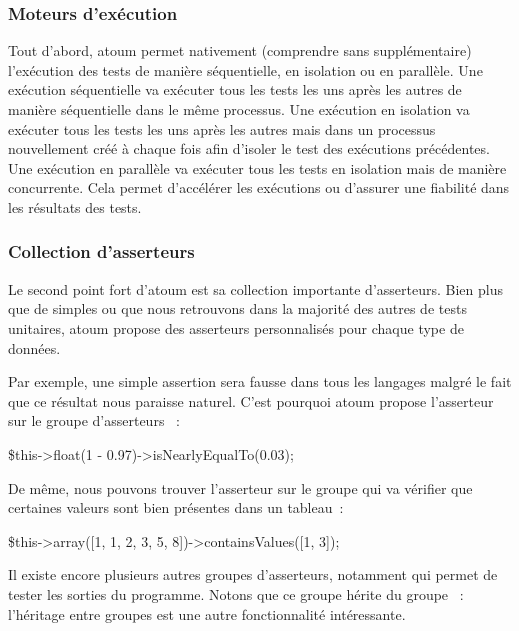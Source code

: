 \subsubsection{Moteurs d'exécution}

Tout d'abord, atoum permet nativement (comprendre sans 
supplémentaire) l'exécution des tests de manière séquentielle, en isolation ou
en parallèle. Une exécution séquentielle va exécuter tous les tests les uns
après les autres de manière séquentielle dans le même processus. Une exécution
en isolation va exécuter tous les tests les uns après les autres mais dans un
processus nouvellement créé à chaque fois afin d'isoler le test des exécutions
précédentes. Une exécution en parallèle va exécuter tous les tests en isolation
mais de manière concurrente. Cela permet d'accélérer les exécutions ou d'assurer
une fiabilité dans les résultats des tests.

\subsubsection{Collection d'asserteurs}

Le second point fort d'atoum est sa collection importante d'asserteurs. Bien
plus que de simples  ou  que nous retrouvons
dans la majorité des autres  de tests unitaires, atoum
propose des asserteurs personnalisés pour chaque type de données.

\begin{example}

Par exemple, une simple assertion  sera fausse dans tous
les langages malgré le fait que ce résultat nous paraisse naturel. C'est
pourquoi atoum propose l'asserteur  sur le groupe
d'asserteurs ~:
%
\begin{pre}
\$this->float(1 - 0.97)->isNearlyEqualTo(0.03);
\end{pre}
%
De même, nous pouvons trouver l'asserteur  sur le groupe
 qui va vérifier que certaines valeurs sont bien présentes dans un
tableau~:
%
\begin{pre}
\$this->array([1, 1, 2, 3, 5, 8])->containsValues([1, 3]);
\end{pre}
%
Il existe encore plusieurs autres groupes d'asserteurs, notamment 
qui permet de tester les sorties du programme. Notons que ce groupe hérite du
groupe ~: l'héritage entre groupes est une autre fonctionnalité
intéressante.

\end{example}

